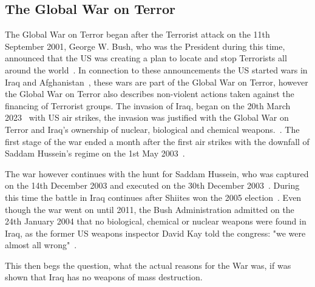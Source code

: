 \subsection{The Global War on Terror}
The Global War on Terror began after the Terrorist attack on the 11th September 2001, George W. Bush, who was the President during this time, announced that the US was creating a plan to locate and stop Terrorists all around the world~\cite{gowt-bushlibrary}. In connection to these announcements the US started wars in Iraq and Afghanistan~\cite{gowt-bushlibrary}, these wars are part of the Global War on Terror, however the Global War on Terror also describes non-violent actions taken against the financing of Terrorist groups.
The invasion of Iraq, began on the 20th March 2023~\cite{cfr-iraq-war} with US air strikes, the invasion was justified with the Global War on Terror and Iraq's ownership of nuclear, biological and chemical weapons.~\cite{britannica-iraq-war}. The first stage of the war ended a month after the first air strikes with the downfall of Saddam Hussein's regime on the 1st May 2003~\cite{cfr-iraq-war}. 

The war however continues with the hunt for Saddam Hussein, who was captured on the 14th December 2003 and executed on the 30th December 2003~\cite{cfr-iraq-war}. During this time the battle in Iraq continues after Shiites won the 2005 election~\cite{cfr-iraq-war}.
Even though the war went on until 2011, the Bush Administration admitted on the 24th January 2004 that no biological, chemical or nuclear weapons were found in Iraq, as the former US weapons inspector David Kay told the congress: "we were almost all wrong"~\cite{cnn-david-kay-senate-hearing}.

This then begs the question, what the actual reasons for the War was, if was shown that Iraq has no weapons of mass destruction.